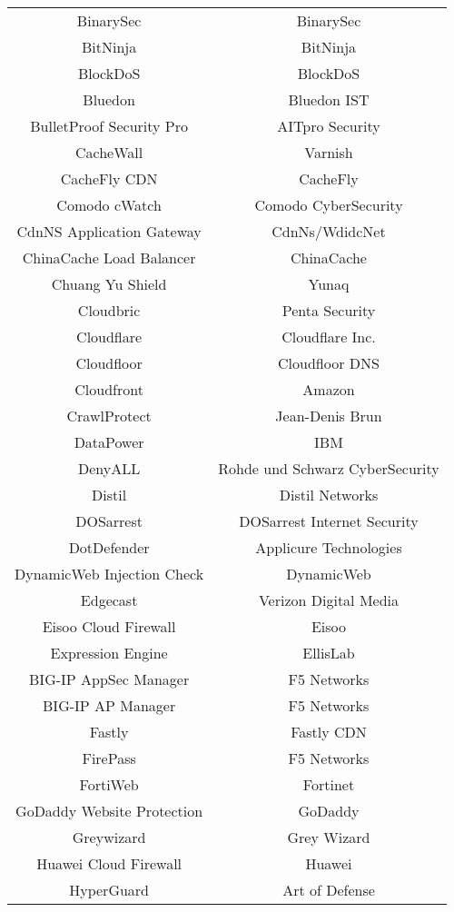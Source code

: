 \begin{table}[h]
\begin{tabular}{|c | c |}
      BinarySec & BinarySec\\
      BitNinja & BitNinja\\
      BlockDoS & BlockDoS\\
      Bluedon & Bluedon IST\\
      BulletProof Security Pro & AITpro Security\\
      CacheWall & Varnish\\
      CacheFly CDN & CacheFly\\
      Comodo cWatch & Comodo CyberSecurity\\
      CdnNS Application Gateway & CdnNs/WdidcNet\\
      ChinaCache Load Balancer & ChinaCache\\
      Chuang Yu Shield & Yunaq\\
      Cloudbric & Penta Security\\
      Cloudflare & Cloudflare Inc.\\
      Cloudfloor & Cloudfloor DNS\\
      Cloudfront & Amazon\\
      CrawlProtect & Jean-Denis Brun\\
      DataPower & IBM\\
      DenyALL & Rohde und Schwarz CyberSecurity\\
      Distil & Distil Networks\\
      DOSarrest & DOSarrest Internet Security\\
      DotDefender & Applicure Technologies\\
      DynamicWeb Injection Check & DynamicWeb\\
      Edgecast & Verizon Digital Media\\
      Eisoo Cloud Firewall & Eisoo\\
      Expression Engine & EllisLab\\
      BIG-IP AppSec Manager & F5 Networks\\
      BIG-IP AP Manager & F5 Networks\\
      Fastly & Fastly CDN\\
      FirePass & F5 Networks\\
      FortiWeb & Fortinet\\
      GoDaddy Website Protection & GoDaddy\\
      Greywizard & Grey Wizard\\
      Huawei Cloud Firewall & Huawei\\
      HyperGuard & Art of Defense\\

\end{tabular}
\end{table}
